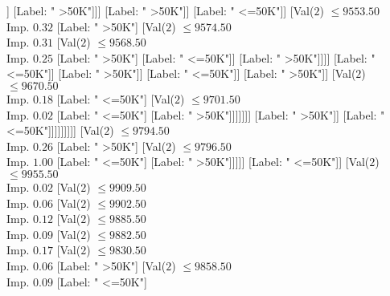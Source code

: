 \documentclass[margin=10pt]{standalone}
\begin{document}
\begin{forest}
																																									[Label: " <=50K"]]
																																								[Label: " >50K"]]]
																																						[Label: " >50K"]]
																																					[Label: " <=50K"]]
																																				[Val($2$) $ \leq 9553.50$ \\ Imp. $0.32$
																																					[Label: " >50K"]
																																					[Val($2$) $ \leq 9574.50$ \\ Imp. $0.31$
																																						[Val($2$) $ \leq 9568.50$ \\ Imp. $0.25$
																																							[Label: " >50K"]
																																							[Label: " <=50K"]]
																																						[Label: " >50K"]]]]
																																			[Label: " <=50K"]]
																																		[Label: " >50K"]]
																																	[Label: " <=50K"]]
																																[Label: " >50K"]]
																															[Val($2$) $ \leq 9670.50$ \\ Imp. $0.18$
																																[Label: " <=50K"]
																																[Val($2$) $ \leq 9701.50$ \\ Imp. $0.02$
																																	[Label: " <=50K"]
																																	[Label: " >50K"]]]]]]]
																											[Label: " >50K"]]
																										[Label: " <=50K"]]]]]]]]]
																		[Val($2$) $ \leq 9794.50$ \\ Imp. $0.26$
																			[Label: " >50K"]
																			[Val($2$) $ \leq 9796.50$ \\ Imp. $1.00$
																				[Label: " <=50K"]
																				[Label: " >50K"]]]]]
																[Label: " <=50K"]]
															[Val($2$) $ \leq 9955.50$ \\ Imp. $0.02$
																[Val($2$) $ \leq 9909.50$ \\ Imp. $0.06$
																	[Val($2$) $ \leq 9902.50$ \\ Imp. $0.12$
																		[Val($2$) $ \leq 9885.50$ \\ Imp. $0.09$
																			[Val($2$) $ \leq 9882.50$ \\ Imp. $0.17$
																				[Val($2$) $ \leq 9830.50$ \\ Imp. $0.06$
																					[Label: " >50K"]
																					[Val($2$) $ \leq 9858.50$ \\ Imp. $0.09$
																						[Label: " <=50K"]

\end{forest}
\end{document}
